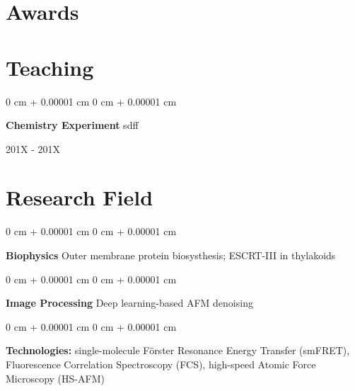 \documentclass[10pt, letterpaper]{article}
\newenvironment{onecolentry}{
        \begin{adjustwidth}{
                        0 cm + 0.00001 cm
                }{
                        0 cm + 0.00001 cm
                }
        }{
        \end{adjustwidth}
} %
\newenvironment{twocolentry}[2][]{
        \onecolentry
        \def\secondColumn{#2}
        \setcolumnwidth{\fill, 4.5 cm}
        \begin{paracol}{2}
        }{
                \switchcolumn \raggedleft \secondColumn
        \end{paracol}
        \endonecolentry
} %
\begin{document}
\section{Awards}

\section{Teaching}
\begin{twocolentry}{ 201X - 201X }
        \textbf{Chemistry Experiment} sdff
\end{twocolentry}

\section{Research Field}
\begin{onecolentry}
        \textbf{Biophysics} Outer membrane protein biosysthesis; ESCRT-III in thylakoids
\end{onecolentry}

\vspace{0.2 cm}

\begin{onecolentry}
        \textbf{Image Processing} Deep learning-based AFM denoising
\end{onecolentry}

\vspace{0.2 cm}

\begin{onecolentry}
        \textbf{Technologies:} single-molecule Förster Resonance Energy Transfer (smFRET), Fluorescence Correlation Spectroscopy (FCS), high-speed Atomic Force Microscopy (HS-AFM)
\end{onecolentry}
\end{document}
